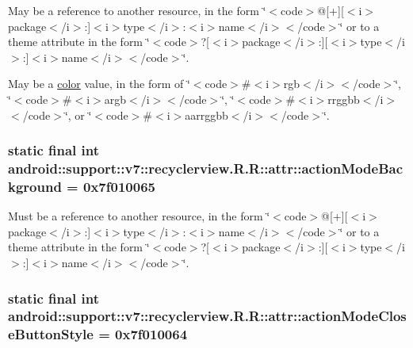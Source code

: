 May be a reference to another resource, in the form \char`\"{}$<$code$>$@\mbox{[}+\mbox{]}\mbox{[}$<$i$>$package$<$/i$>$:\mbox{]}$<$i$>$type$<$/i$>$:$<$i$>$name$<$/i$>$$<$/code$>$\char`\"{} or to a theme attribute in the form \char`\"{}$<$code$>$?\mbox{[}$<$i$>$package$<$/i$>$:\mbox{]}\mbox{[}$<$i$>$type$<$/i$>$:\mbox{]}$<$i$>$name$<$/i$>$$<$/code$>$\char`\"{}. 

May be a \hyperlink{classandroid_1_1support_1_1v7_1_1recyclerview_1_1_r_1_1color}{color} value, in the form of \char`\"{}$<$code$>$\#$<$i$>$rgb$<$/i$>$$<$/code$>$\char`\"{}, \char`\"{}$<$code$>$\#$<$i$>$argb$<$/i$>$$<$/code$>$\char`\"{}, \char`\"{}$<$code$>$\#$<$i$>$rrggbb$<$/i$>$$<$/code$>$\char`\"{}, or \char`\"{}$<$code$>$\#$<$i$>$aarrggbb$<$/i$>$$<$/code$>$\char`\"{}. \hypertarget{classandroid_1_1support_1_1v7_1_1recyclerview_1_1_r_1_1attr_8e1d79218e9804b5a3817e51357eb471}{
\subsubsection[{actionModeBackground}]{\setlength{\rightskip}{0pt plus 5cm}static final int android::support::v7::recyclerview.R.R::attr::actionModeBackground = 0x7f010065}}
\label{classandroid_1_1support_1_1v7_1_1recyclerview_1_1_r_1_1attr_8e1d79218e9804b5a3817e51357eb471}


Must be a reference to another resource, in the form \char`\"{}$<$code$>$@\mbox{[}+\mbox{]}\mbox{[}$<$i$>$package$<$/i$>$:\mbox{]}$<$i$>$type$<$/i$>$:$<$i$>$name$<$/i$>$$<$/code$>$\char`\"{} or to a theme attribute in the form \char`\"{}$<$code$>$?\mbox{[}$<$i$>$package$<$/i$>$:\mbox{]}\mbox{[}$<$i$>$type$<$/i$>$:\mbox{]}$<$i$>$name$<$/i$>$$<$/code$>$\char`\"{}. \hypertarget{classandroid_1_1support_1_1v7_1_1recyclerview_1_1_r_1_1attr_8920b00e27ca26f3831cae834cbe9251}{
\subsubsection[{actionModeCloseButtonStyle}]{\setlength{\rightskip}{0pt plus 5cm}static final int android::support::v7::recyclerview.R.R::attr::actionModeCloseButtonStyle = 0x7f010064}}
\label{classandroid_1_1support_1_1v7_1_1recyclerview_1_1_r_1_1attr_8920b00e27ca26f3831cae834cbe9251}


